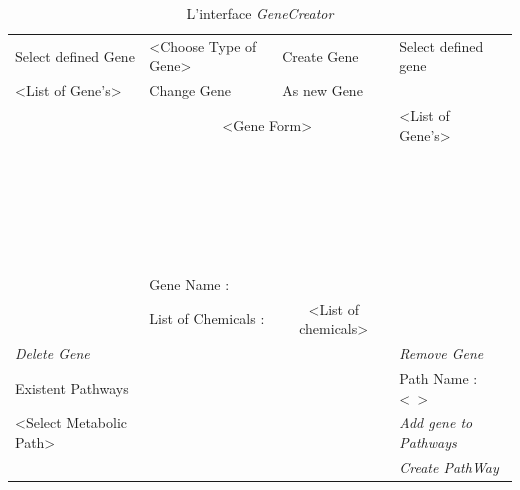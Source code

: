 \documentclass[11pt,twoside,a4paper]{article}
\begin{document}
\begin{table}[h]
	\centering
	\begin{scriptsize}
	\begin{tabular}{|l|l|l|l|}
	\hline
	Select defined Gene	& <Choose Type of Gene> & Create Gene 				& Select defined gene \\
				\cline{2-3}
	<List of Gene's>	& Change Gene & As new Gene					&		      \\
				\cline{2-3}
				& \multicolumn{2}{|c|}{<Gene Form>}				& <List of Gene's>    \\
				& \multicolumn{2}{|c|}{~} 					&		      \\
				& \multicolumn{2}{|c|}{~} 					&		      \\
				& \multicolumn{2}{|c|}{~} 					&		      \\
				& \multicolumn{2}{|c|}{~} 					&		      \\
				& \multicolumn{2}{|c|}{~} 					&		      \\
				\cline{2-3}
				& Gene Name : 		& 					& 		      \\
				\cline{2-3}
				& List of Chemicals :	& \multicolumn{1}{|c|}{<List of chemicals>}& 		      \\
	\hline
	\emph{Delete Gene}	& \multicolumn{2}{|c|}{~}					& \emph{Remove Gene}  \\
	\hline
	Existent Pathways	& \multicolumn{2}{|c|}{~}					& Path Name : <~>     \\
	<Select Metabolic Path> & \multicolumn{2}{|c|}{~}				& \emph{Add gene to Pathways} \\
				& \multicolumn{2}{|c|}{~}				& \emph{Create PathWay}\\
	\hline
	\end{tabular}
	\caption[L'interface \emph{GeneCreator}]{L'interface \emph{GeneCreator}}
	\label{tab:GeneCreator}
	\end{scriptsize}
\end{table}
\end{document}
